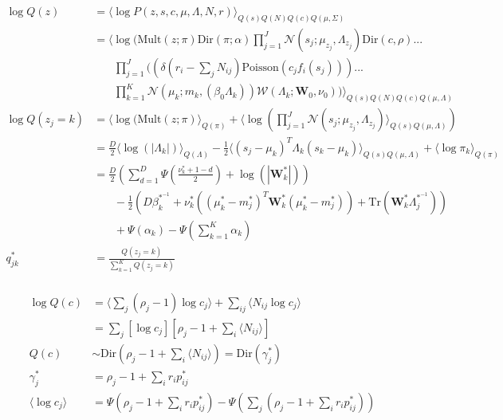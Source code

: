\documentclass[12pt]{article}
\begin{document}
\begin{equation}
\begin{aligned}
\log Q(z) &= \langle \log P(z, s, c, \mu, \Lambda, N, r) \rangle_{Q(s)Q(N)Q(c)Q(\mu, \Sigma)}\\
&= \langle \log(\text{Mult}(z; \pi) \text{Dir}(\pi; \alpha) \prod_{j=1}^J \mathcal{N}(s_j; \mu_{z_j}, \Lambda_{z_j}) \text{Dir}(c, \rho)...\\
& \phantom{{}=1} \prod_{j=1}^J ((\delta(r_i - \sum_j N_{ij}) \text{Poisson}(c_j f_i(s_j)))...\\
& \phantom{{}=1} \prod_{k=1}^K \mathcal{N}(\mu_k; m_k, (\beta_0 \Lambda_k)) \mathcal{W}(\Lambda_k; \textbf{W}_0 ,\nu_0)) \rangle_{Q(s)Q(N)Q(c)Q(\mu, \Lambda)}\\
\log Q(z_j = k) &= \langle \log(\text{Mult}(z; \pi) \rangle_{Q(\pi)} + \langle \log (\prod_{j=1}^J \mathcal{N}(s_j; \mu_{z_j}, \Lambda_{z_j}) \rangle_{Q(s)Q(\mu, \Lambda)})\\
&= \frac{D}{2} \langle \log (|\Lambda_k|) \rangle_{Q(\Lambda)} - \frac{1}{2} \langle (s_j - \mu_k)^T \Lambda_k (s_k - \mu_k) \rangle_{Q(s)Q(\mu, \Lambda)} + \langle \log \pi_k \rangle_{Q(\pi)}\\
&= \frac{D}{2} (\sum_{d=1}^D \Psi (\frac{\nu_k^* + 1 - d}{2}) + \log (|\textbf{W}_k^*|))\\
& \phantom{{}=1} - \frac{1}{2} (D \beta_k^{*^{-1}} + \nu_k^* ((\mu_k^* - m_j^*)^T \textbf{W}_k^* (\mu_k^* - m_j^*)) + \text{Tr}(\textbf{W}_k^* \Lambda_j^{*^{-1}}))\\
& \phantom{{}=1} + \Psi(\alpha_k) - \Psi(\sum_{k=1}^K \alpha_k)\\
q_{jk}^* &= \frac{Q(z_j = k)}{\sum_{k=1}^K Q(z_j = k)}
\end{aligned}
\end{equation}
\\
\begin{equation}
\begin{aligned}
\log Q(c) &= \langle \sum_j (\rho_j - 1) \log c_j \rangle + \sum_{ij} \langle N_{ij} \log c_j \rangle \\
&= \sum_j [\log c_j][\rho_j - 1 + \sum_i \langle N_{ij} \rangle]\\
Q(c) &\sim \text{Dir}(\rho_j - 1 + \sum_i \langle N_{ij} \rangle) = \text{Dir}(\gamma_j^*)\\
\gamma_j^* &= \rho_j - 1 + \sum_i r_i p^*_{ij}\\
\langle \log c_j \rangle &= \Psi(\rho_j - 1 + \sum_i r_i p^*_{ij}) - \Psi(\sum_j (\rho_j - 1 + \sum_i r_i p^*_{ij}))
\end{aligned}
\end{equation}
\end{document}
